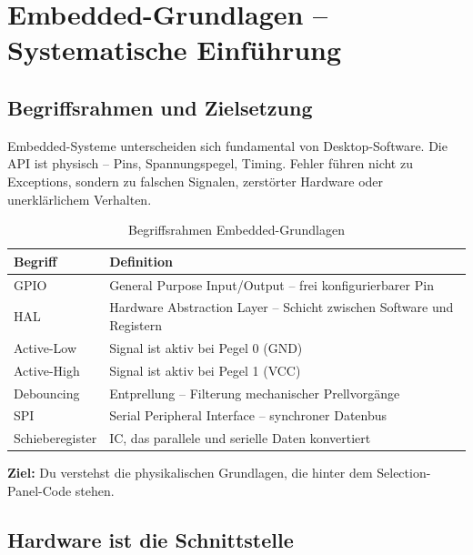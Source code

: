 
\section{Embedded-Grundlagen – Systematische Einführung}

\subsection{Begriffsrahmen und Zielsetzung}

Embedded-Systeme unterscheiden sich fundamental von Desktop-Software. Die \glqq API\grqq{} ist physisch – Pins, Spannungspegel, Timing. Fehler führen nicht zu Exceptions, sondern zu falschen Signalen, zerstörter Hardware oder unerklärlichem Verhalten.

\begin{table}[htbp]
\centering
\begin{tabular}{@{}ll@{}}
\toprule
\textbf{Begriff} & \textbf{Definition} \\
\midrule
GPIO            & General Purpose Input/Output – frei konfigurierbarer Pin \\
HAL             & Hardware Abstraction Layer – Schicht zwischen Software und Registern \\
Active-Low      & Signal ist aktiv bei Pegel 0 (GND) \\
Active-High     & Signal ist aktiv bei Pegel 1 (VCC) \\
Debouncing      & Entprellung – Filterung mechanischer Prellvorgänge \\
SPI             & Serial Peripheral Interface – synchroner Datenbus \\
Schieberegister & IC, das parallele und serielle Daten konvertiert \\
\bottomrule
\end{tabular}
\caption{Begriffsrahmen Embedded-Grundlagen}
\label{tab:grundlagen-begriffe}
\end{table}

\textbf{Ziel:} Du verstehst die physikalischen Grundlagen, die hinter dem Selection-Panel-Code stehen.

\subsection{Hardware ist die Schnittstelle}

